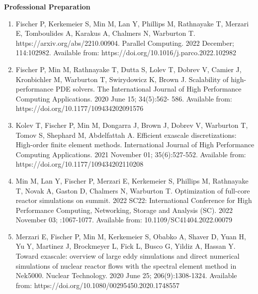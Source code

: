 \documentclass[11pt,letterpaper,english]{article}
\begin{document}
\begin{flushleft} {\bf Professional Preparation}
\begin{enumerate}
 \item
  Fischer P, Kerkemeier S, Min M, Lan Y, Phillips M, Rathnayake T, Merzari E, Tomboulides A, Karakus A, Chalmers N, Warburton T. https://arxiv.org/abs/2210.00904. Parallel Computing. 2022 December; 114:102982. Available from: https://doi.org/10.1016/j.parco.2022.102982
   
 \item
  Fischer P, Min M, Rathnayake T, Dutta S, Lolev T, Dobrev V, Camier J, Kronbichler M, Warburton T, Swirydowicz K, Brown J. Scalability of high-performance PDE solvers. The International Journal of High Performance Computing Applications. 2020 June 15; 34(5):562- 586. Available from: https://doi.org/10.1177/109434202091576

 \item
  Kolev T, Fischer P, Min M, Dongarra J, Brown J, Dobrev V, Warburton T, Tomov S, Shephard M, Abdelfattah A. Efficient exascale discretizations: High-order finite element methods. International Journal of High Performance Computing Applications. 2021 November 01; 35(6):527-552. Available from: https://doi.org/10.1177/109434202110208

 \item
  Min M, Lan Y, Fischer P, Merzari E, Kerkemeier S, Phillips M, Rathnayake T, Novak A, Gaston D, Chalmers N, Warburton T. Optimization of full-core reactor simulations on summit. 2022 SC22: International Conference for High Performance Computing, Networking, Storage and Analysis (SC). 2022 November 03; :1067-1077. Available from: 10.1109/SC41404.2022.00079
 
 \item
  Merzari E, Fischer P, Min M, Kerkemeier S, Obabko A, Shaver D, Yuan H, Yu Y, Martinez J, Brockmeyer L, Fick L, Busco G, Yildiz A, Hassan Y. Toward exascale: overview of large eddy simulations and direct numerical simulations of nuclear reactor flows with the spectral element method in Nek5000. Nuclear Technology. 2020 June 25; 206(9):1308-1324. Available from: https://doi.org/10.1080/00295450.2020.1748557


\end{enumerate}
\end{flushleft}
\end{document}
